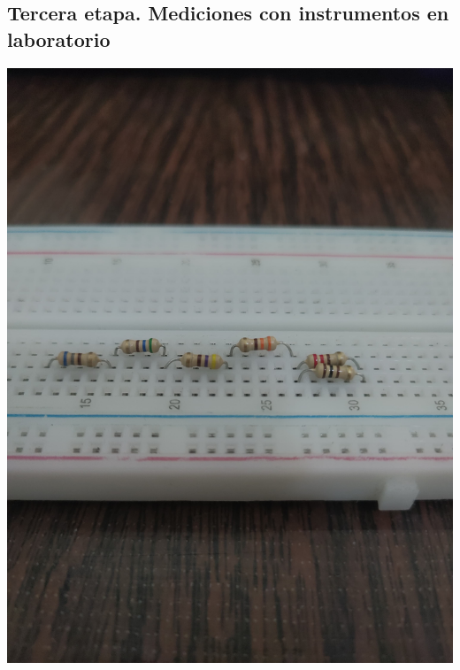 \documentclass[10pt]{article}
\begin{document}
\begin{multicols}{2}
\section{Tercera etapa. Mediciones con instrumentos en laboratorio}

\includegraphics[width=\linewidth]{Imagenes/Proto.jpeg}

\end{multicols}
\end{document}
